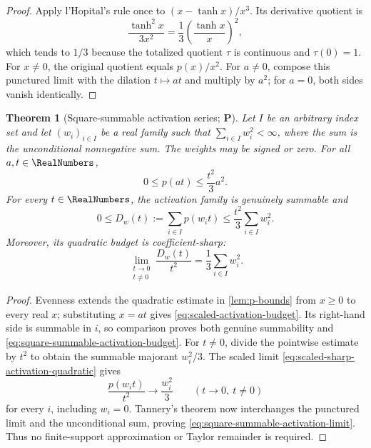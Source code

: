 \documentclass[11pt,oneside]{article}
\newtheorem{theorem}{Theorem}[section]
\theoremstyle{definition}
\theoremstyle{remark}
\newcommand{\statusP}{\textcolor{deepgreen}{\textbf{P}}}
\begin{document}
\begin{proof}
Apply l'Hopital's rule once to
$(x-\tanh x)/x^3$.  Its derivative quotient is
\[
 \frac{\tanh^2x}{3x^2}
 =\frac13\left(\frac{\tanh x}{x}\right)^2,
\]
which tends to $1/3$ because the totalized quotient $\tau$ is continuous and
$\tau(0)=1$.  For $x\ne0$, the original quotient equals $p(x)/x^2$.
For $a\ne0$, compose this punctured limit with the dilation $t\mapsto at$
and multiply by $a^2$; for $a=0$, both sides vanish identically.
\end{proof}

\begin{theorem}[Square-summable activation series; \statusP]
\label{thm:square-summable-activation-series}
Let $I$ be an arbitrary index set and let $(w_i)_{i\in I}$ be a real family
such that $\sum_{i\in I}w_i^2<\infty$, where the sum is the unconditional
nonnegative sum.  The weights may be signed or zero.  For all $a,t\in\RealNumbers$,
\begin{equation}
 0\le p(at)\le \frac{t^2}{3}a^2.
 \label{eq:scaled-activation-budget}
\end{equation}
For every $t\in\RealNumbers$, the activation family is genuinely summable and
\begin{equation}
 0\le D_w(t):=\sum_{i\in I}p(w_it)
 \le \frac{t^2}{3}\sum_{i\in I}w_i^2.
 \label{eq:square-summable-activation-budget}
\end{equation}
Moreover, its quadratic budget is coefficient-sharp:
\begin{equation}
 \boxed{
 \lim_{\substack{t\to0\\t\ne0}}\frac{D_w(t)}{t^2}
 =\frac13\sum_{i\in I}w_i^2.}
 \label{eq:square-summable-activation-limit}
\end{equation}
\end{theorem}

\begin{proof}
Evenness extends the quadratic estimate in \cref{lem:p-bounds} from
$x\ge0$ to every real $x$; substituting $x=at$ gives
\eqref{eq:scaled-activation-budget}.  Its right-hand side is summable in $i$,
so comparison proves both genuine summability and
\eqref{eq:square-summable-activation-budget}.  For $t\ne0$, divide the
pointwise estimate by $t^2$ to obtain the summable majorant $w_i^2/3$.
The scaled limit \eqref{eq:scaled-sharp-activation-quadratic} gives
\[
 \frac{p(w_it)}{t^2}\longrightarrow\frac{w_i^2}{3}
 \qquad (t\to0,\ t\ne0)
\]
for every $i$, including $w_i=0$.  Tannery's theorem now interchanges the
punctured limit and the unconditional sum, proving
\eqref{eq:square-summable-activation-limit}.  Thus no finite-support
approximation or Taylor remainder is required.
\end{proof}
\end{document}
